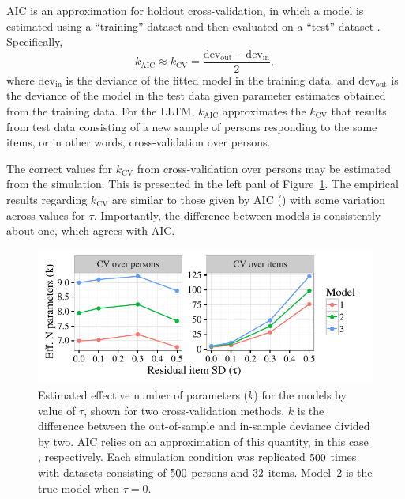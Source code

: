 \documentclass[12pt, letterpaper]{article}
\begin{document}
AIC is an approximation for holdout cross-validation, in which a model is estimated using a ``training'' dataset and then evaluated on a ``test'' dataset . Specifically,
\begin{equation}
	k_\mathrm{AIC} \approx k_\mathrm{CV} = \frac{\mathrm{dev_{out}} - \mathrm{dev_{in}}}{2}
,\end{equation}
where $\mathrm{dev_{in}}$ is the deviance of the fitted model in the training data, and $\mathrm{dev_{out}}$ is the deviance of the model in the test data given parameter estimates obtained from the training data. 
For the LLTM, $k_\mathrm{AIC}$ approximates the $k_\mathrm{CV}$ that results from test data consisting of a new sample of persons responding to the same items, or in other words, cross-validation over persons.  

The correct values for $k_\mathrm{CV}$ from cross-validation over persons may be estimated from the simulation.
This is presented in the left panl of Figure~\ref{fig:k-overtau}. The empirical results regarding $k_\mathrm{CV}$ are similar to those given by AIC (\aic[and]) with some variation across values for $\tau$. Importantly, the difference between models is consistently about one, which agrees with AIC.

\begin{figure}[tbp]
	\centering
	\includegraphics{chapter_2/figs/k_overtau.pdf}
	\caption{Estimated effective number of parameters ($k$) for the models by value of $\tau$, shown for two cross-validation methods. $k$ is the difference between the out-of-sample and in-sample deviance divided by two. AIC relies on an approximation of this quantity, in this case \aic[and], respectively. Each simulation condition was replicated $500$ times with datasets consisting of $500$ persons and $32$ items. Model~2 is the true model when $\tau = 0$.}
	\label{fig:k-overtau}
\end{figure}
\end{document}
